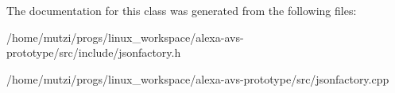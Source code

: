 The documentation for this class was generated from the following files\+:\begin{DoxyCompactItemize}
\item 
/home/mutzi/progs/linux\+\_\+workspace/alexa-\/avs-\/prototype/src/include/jsonfactory.\+h\item 
/home/mutzi/progs/linux\+\_\+workspace/alexa-\/avs-\/prototype/src/jsonfactory.\+cpp\end{DoxyCompactItemize}
